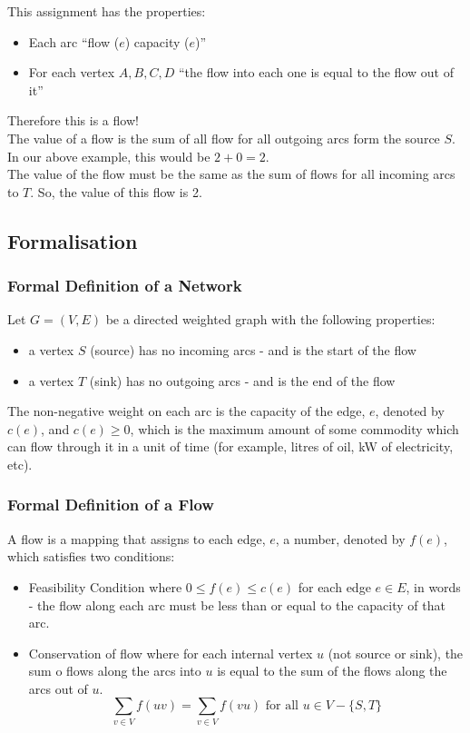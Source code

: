 This assignment has the properties:
\begin{itemize}
    \item Each arc ``flow ($e$) \leq capacity ($e$)''
    \item For each vertex $A, B, C, D$ ``the flow into each one is equal to the flow out of it''
\end{itemize}
Therefore this is a flow!\\

The value of a flow is the sum of all flow for all outgoing arcs form the source $S$. In our above example, this would be $2 + 0 = 2$.\\

The value of the flow must be the same as the sum of flows for all incoming arcs to $T$. So, the value of this flow is 2. 

\subsection{Formalisation}
\subsubsection{Formal Definition of a Network}
Let $G = (V, E)$ be a directed weighted graph with the following properties:
\begin{itemize}
    \item a vertex $S$ (source) has no incoming arcs - and is the start of the flow
    \item a vertex $T$ (sink) has no outgoing arcs - and is the end of the flow
\end{itemize}
The non-negative weight on each arc is the capacity of the edge, $e$, denoted by $c(e)$, and $c(e) \geq 0$, which is the maximum amount of some commodity which can flow through it in a unit of time (for example, litres of oil, kW of electricity, etc).

\subsubsection{Formal Definition of a Flow}
A flow is a mapping that assigns to each edge, $e$, a number, denoted by $f(e)$, which satisfies two conditions:
\begin{itemize}
    \item Feasibility Condition where $0 \leq f(e) \leq c(e)$ for each edge $e \in E$, in words - the flow along each arc must be less than or equal to the capacity of that arc.
    \item Conservation of flow where for each internal vertex $u$ (not source or sink), the sum o flows along the arcs into $u$ is equal to the sum of the flows along the arcs out of $u$.
    \[\sum_{v \in V} f(uv) = \sum_{v \in V} f(vu) \text{ for all } u \in V - \{S, T\}\]
\end{itemize}

